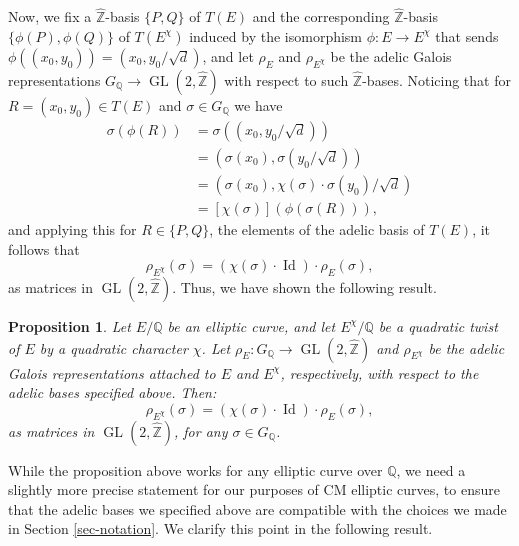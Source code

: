 \documentclass[11pt]{amsart}
\newtheorem{prop}[defn]{Proposition}
\theoremstyle{definition}
\newcommand{\Q}{\mathbb{Q}}
\newcommand{\Z}{\mathbb{Z}}
\newcommand{\GL}{\operatorname{GL}}
\begin{document}
Now, we fix a $\widehat{\Z}$-basis $\{P,Q\}$ of $T(E)$ and the corresponding $\widehat{\Z}$-basis $\{\phi(P),\phi(Q)\}$ of $T(E^\chi)$ induced by the isomorphism $\phi\colon E\to E^\chi$ that sends $\phi((x_0,y_0))=(x_0,y_0/\sqrt{d})$, and let $\rho_E$ and $\rho_{E^\chi}$ be the adelic Galois representations $G_\Q\to \GL(2,\widehat{\Z})$ with respect to such $\widehat{\Z}$-bases. Noticing that for $R=(x_0,y_0)\in T(E)$ and $\sigma\in G_\Q$ we have
\begin{align*}
    \sigma(\phi(R)) &=\sigma((x_0,y_0/\sqrt{d}))\\
    &=(\sigma(x_0),\sigma(y_0/\sqrt{d}))\\
    &=(\sigma(x_0),\chi(\sigma)\cdot \sigma(y_0)/\sqrt{d})\\
    &=[\chi(\sigma)](\phi(\sigma(R))),
\end{align*}
and applying this for $R\in \{P,Q\}$, the elements of the adelic basis of $T(E)$, it follows that 
$$\rho_{E^\chi}(\sigma) = (\chi(\sigma)\cdot \operatorname{Id})\cdot \rho_{E}(\sigma),$$
as matrices in $\GL(2,\widehat{\Z})$. Thus, we have shown the following result.

\begin{prop}\label{cpx_conj_lemma2}\label{cpx_conj_prop2}
    Let $E/\Q$ be an elliptic curve, and let $E^{\chi}/\Q$ be a quadratic twist of $E$ by a quadratic character $\chi$. Let $\rho_{E} \colon G_{\Q} \to \GL(2,\widehat{\Z})$ and $\rho_{E^\chi}$ be the adelic Galois representations attached to $E$ and $E^\chi$, respectively, with respect to the adelic bases specified above. Then: 
$$\rho_{E^\chi}(\sigma) = (\chi(\sigma)\cdot \operatorname{Id})\cdot \rho_{E}(\sigma),$$
as matrices in $\GL(2,\widehat{\Z})$, for any $\sigma \in G_\Q$.
\end{prop}


While the proposition above works for any elliptic curve over $\Q$, we need a slightly more precise statement for our purposes of CM elliptic curves, to ensure that the adelic bases we specified above are compatible with the choices we made in Section \ref{sec-notation}. We clarify this point in the following result.
\end{document}
